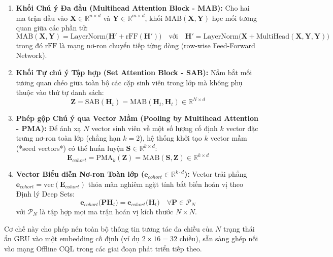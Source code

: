 \begin{enumerate}[label=\textbf{\arabic*.}]
  \item \textbf{Khối Chú ý Đa đầu (Multihead Attention Block - MAB):}
  Cho hai ma trận đầu vào $\mathbf{X} \in \mathbb{R}^{n \times d}$ và $\mathbf{Y} \in \mathbb{R}^{m \times d}$, khối $\text{MAB}(\mathbf{X}, \mathbf{Y})$ học mối tương quan giữa các phần tử:
  \begin{equation}\label{eq:mab-def}
    \text{MAB}(\mathbf{X}, \mathbf{Y}) = \text{LayerNorm}\big(\mathbf{H}' + \text{rFF}(\mathbf{H}')\big) \quad \text{với} \quad \mathbf{H}' = \text{LayerNorm}\big(\mathbf{X} + \text{MultiHead}(\mathbf{X}, \mathbf{Y}, \mathbf{Y})\big)
  \end{equation}
  trong đó $\text{rFF}$ là mạng nơ-ron chuyển tiếp từng dòng (row-wise Feed-Forward Network).

  \item \textbf{Khối Tự chú ý Tập hợp (Set Attention Block - SAB):}
  Nắm bắt mối tương quan chéo giữa toàn bộ các cặp sinh viên trong lớp mà không phụ thuộc vào thứ tự danh sách:
  \begin{equation}\label{eq:sab-def}
    \mathbf{Z} = \text{SAB}(\mathbf{H}_t) = \text{MAB}(\mathbf{H}_t, \mathbf{H}_t) \in \mathbb{R}^{N \times d}
  \end{equation}

  \item \textbf{Phép gộp Chú ý qua Vector Mầm (Pooling by Multihead Attention - PMA):}
  Để ánh xạ $N$ vector sinh viên về một số lượng cố định $k$ vector đặc trưng nơ-ron toàn lớp (chẳng hạn $k=2$), hệ thống khởi tạo $k$ vector mầm (*seed vectors*) có thể huấn luyện $\mathbf{S} \in \mathbb{R}^{k \times d}$:
  \begin{equation}\label{eq:pma-def}
    \mathbf{E}_{cohort} = \text{PMA}_k(\mathbf{Z}) = \text{MAB}(\mathbf{S}, \mathbf{Z}) \in \mathbb{R}^{k \times d}
  \end{equation}
  \item \textbf{Vector Biểu diễn Nơ-ron Toàn lớp ($\mathbf{e}_{cohort} \in \mathbb{R}^{k \cdot d}$):}
  Vector trải phẳng $\mathbf{e}_{cohort} = \text{vec}(\mathbf{E}_{cohort})$ thỏa mãn nghiêm ngặt tính bất biến hoán vị theo Định lý Deep Sets:
  \begin{equation}\label{eq:permutation-invariance}
    \mathbf{e}_{cohort}\big(\mathbf{P} \mathbf{H}_t\big) = \mathbf{e}_{cohort}\big(\mathbf{H}_t\big) \quad \forall \mathbf{P} \in \mathcal{P}_N
  \end{equation}
  với $\mathcal{P}_N$ là tập hợp mọi ma trận hoán vị kích thước $N \times N$.
\end{enumerate}
Cơ chế này cho phép nén toàn bộ thông tin tương tác đa chiều của $N$ trạng thái ẩn GRU vào một embedding cố định (ví dụ $2 \times 16 = 32$ chiều), sẵn sàng ghép nối vào mạng Offline CQL trong các giai đoạn phát triển tiếp theo.

